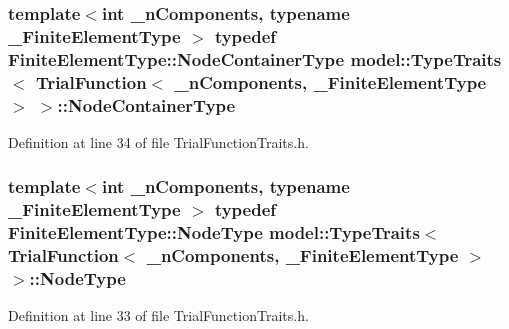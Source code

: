 \subsubsection[{Node\+Container\+Type}]{\setlength{\rightskip}{0pt plus 5cm}template$<$int \+\_\+n\+Components, typename \+\_\+\+Finite\+Element\+Type $>$ typedef Finite\+Element\+Type\+::\+Node\+Container\+Type {\bf model\+::\+Type\+Traits}$<$ {\bf Trial\+Function}$<$ \+\_\+n\+Components, \+\_\+\+Finite\+Element\+Type $>$ $>$\+::{\bf Node\+Container\+Type}}\label{structmodel_1_1_type_traits_3_01_trial_function_3_01__n_components_00_01___finite_element_type_01_4_01_4_aec3259c82f9426309f6e9bd82cc7ed9b}


Definition at line 34 of file Trial\+Function\+Traits.\+h.

\hypertarget{structmodel_1_1_type_traits_3_01_trial_function_3_01__n_components_00_01___finite_element_type_01_4_01_4_aef6826b6f376b34cee7ad2f9a964108b}{}
\subsubsection[{Node\+Type}]{\setlength{\rightskip}{0pt plus 5cm}template$<$int \+\_\+n\+Components, typename \+\_\+\+Finite\+Element\+Type $>$ typedef Finite\+Element\+Type\+::\+Node\+Type {\bf model\+::\+Type\+Traits}$<$ {\bf Trial\+Function}$<$ \+\_\+n\+Components, \+\_\+\+Finite\+Element\+Type $>$ $>$\+::{\bf Node\+Type}}\label{structmodel_1_1_type_traits_3_01_trial_function_3_01__n_components_00_01___finite_element_type_01_4_01_4_aef6826b6f376b34cee7ad2f9a964108b}


Definition at line 33 of file Trial\+Function\+Traits.\+h.

\hypertarget{structmodel_1_1_type_traits_3_01_trial_function_3_01__n_components_00_01___finite_element_type_01_4_01_4_a785ffa59903e476a8bc25da5e84ede33}{}
